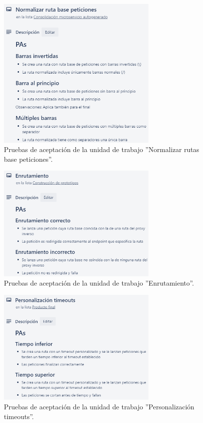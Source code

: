 \documentclass[11pt,spanish,listoffigures]{tfgetsinf}
\begin{document}
\begin{figure}[ht]
\centering
\includegraphics[width=0.7\textwidth]{imagenes/PAsNormalizarRutaBasePeticiones}
\caption{Pruebas de aceptación de la unidad de trabajo ''Normalizar rutas base peticiones''.}
	\label{PAsNormalizarRutaBasePeticiones}
\end{figure}

\begin{figure}[ht]
\centering
\includegraphics[width=0.7\textwidth]{imagenes/PAsEnrutamiento}
\caption{Pruebas de aceptación de la unidad de trabajo ''Enrutamiento''.}
	\label{PAsEnrutamiento}
\end{figure}

\begin{figure}[ht]
\centering
\includegraphics[width=0.7\textwidth]{imagenes/PAsPersonalizacionTimeouts}
\caption{Pruebas de aceptación de la unidad de trabajo ''Personalización timeouts''.}
	\label{PAsPersonalizacionTimeouts}
\end{figure}
\end{document}
